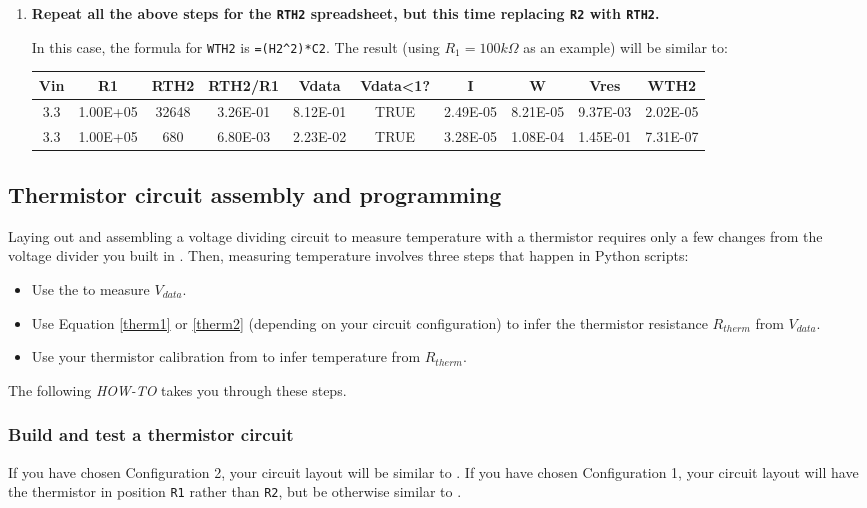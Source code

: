 \begin{enumerate}
	\item \textbf{Repeat all the above steps for the \texttt{RTH2} spreadsheet, but this time replacing \texttt{R2} with \texttt{RTH2}.}
	
	In this case, the formula for \texttt{WTH2} is \lstinline{=(H2^2)*C2}.
	The result (using $R_1=100k\Omega$ as an example) will be similar to:
\begin{table}[H]
	\centering
	\begin{small}
		\begin{tabular}{|c|c|c|c|c|c|c|c|c|c|}
			\hline 
			Vin  & R1 & RTH2 & RTH2/R1 & Vdata & Vdata<1? & I & W & Vres & WTH2\\ 
			\hline 
			3.3 & 1.00E+05  & 32648 & 3.26E-01 & 8.12E-01 & TRUE & 2.49E-05 & 8.21E-05 & 9.37E-03 & 2.02E-05\\ 
			\hline 
			3.3 & 1.00E+05  & 680 & 6.80E-03 & 2.23E-02 & TRUE & 3.28E-05 & 1.08E-04 & 1.45E-01 & 7.31E-07\\ 
			\hline 
		\end{tabular} 
	\end{small}
\end{table}	
	
\end{enumerate}


\subsection{Thermistor circuit assembly and programming}
Laying out and assembling a voltage dividing circuit to measure temperature with a thermistor requires only a few changes from the voltage divider you built in .
Then, measuring temperature involves three steps that happen in Python scripts:   
\begin{itemize}
	\item Use the \adc to measure $V_{data}$.
	\item Use Equation \ref{therm1} or \ref{therm2} (depending on your circuit configuration) to infer the thermistor resistance $R_{therm}$ from $V_{data}$.
	\item Use your thermistor calibration from  to infer temperature from $R_{therm}$.
\end{itemize} 
The following \textit{HOW-TO} takes you through these steps. 
 
\subsubsection{\howto Build and test a thermistor circuit}
If you have chosen Configuration 2, your circuit layout will be similar to .
If you have chosen Configuration 1, your circuit layout will have the thermistor in position \texttt{R1} rather than \texttt{R2}, but be otherwise similar to .

